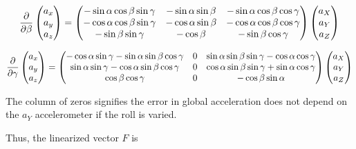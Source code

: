\documentclass[10pt]{article}
\begin{document}
\begin{equation}
  \frac{\partial}{\partial \beta}
  \begin{pmatrix}
    a_x \\ a_y \\ a_z
  \end{pmatrix}
  = 
\begin{pmatrix}
 -\sin\alpha\cos\beta\sin\gamma & -\sin\alpha\sin\beta & -\sin\alpha \cos\beta \cos\gamma\\
 -\cos{\alpha}\cos\beta\sin\gamma & -\cos{\alpha}\sin\beta & -\cos{\alpha}\cos\beta\cos\gamma \\
 -\sin\beta\sin\gamma & -\cos\beta & -\sin\beta \cos\gamma\\
\end{pmatrix}
\begin{pmatrix}
a_X \\ a_Y \\ a_Z
\end{pmatrix}
\end{equation}

\begin{equation}
  \frac{\partial}{\partial \gamma}
  \begin{pmatrix}
    a_x \\ a_y \\ a_z
  \end{pmatrix}
  = 
\begin{pmatrix}
-\cos{\alpha}\sin\gamma -\sin\alpha\sin\beta\cos\gamma & 0 & \sin\alpha\sin\beta\sin\gamma - \cos{\alpha}\cos\gamma \\
\sin\alpha\sin\gamma - \cos{\alpha}\sin\beta\cos\gamma & 0 & \cos{\alpha}\sin\beta\sin\gamma + \sin\alpha\cos\gamma \\
\cos\beta \cos\gamma & 0 & -\cos\beta\sin\alpha  
\end{pmatrix}
\begin{pmatrix}
a_X \\ a_Y \\ a_Z
\end{pmatrix}
\end{equation}

The column of zeros signifies the error in global acceleration does not depend on the $a_Y$ accelerometer if the roll is varied.

Thus, the linearized vector $F$ is 
\newcommand\dd[2]{\dfrac{\partial a_{#1}}{\partial {#2}} }
\def\dts{\dfrac{dt^2}{2}}
\end{document}
